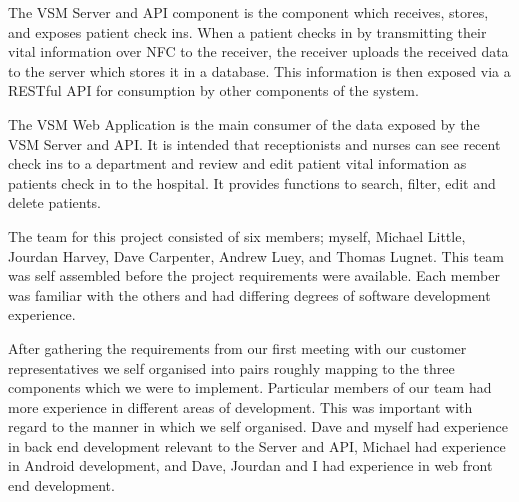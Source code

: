 \documentclass[conference]{IEEEtran}
\begin{document}
The VSM Server and API \cite{vsmsvr} component is the component which receives,
stores, and exposes patient check ins. When a patient checks in by transmitting
their vital information over NFC to the receiver, the receiver uploads the
received data to the server which stores it in a database. This information is
then exposed via a RESTful API for consumption by other components of the
system.

The VSM Web Application \cite{vsmsvr} is the main consumer of the data exposed
by the VSM Server and API. It is intended that receptionists and nurses can see
recent check ins to a department and review and edit patient vital information
as patients check in to the hospital. It provides functions to search, filter,
edit and delete patients.

The team for this project consisted of six members; myself, Michael Little,
Jourdan Harvey, Dave Carpenter, Andrew Luey, and Thomas Lugnet. This team was
self assembled before the project requirements were available. Each member was
familiar with the others and had differing degrees of software development
experience.



After gathering the requirements from our first meeting with our customer
representatives we self organised into pairs roughly mapping to the three
components which we were to implement. Particular members of our team had more
experience in different areas of development. This was important with regard to
the manner in which we self organised. Dave and myself had experience in back
end development relevant to the Server and API, Michael had experience in
Android development, and Dave, Jourdan and I had experience in web front end
development.
\end{document}
